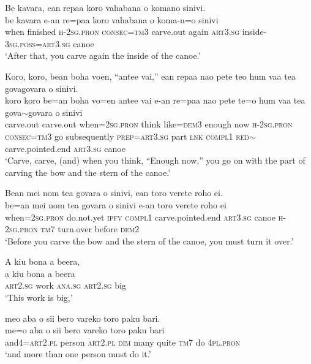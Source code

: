 \ea\label{ex:text18-18}
Be kavara, ean repaa koro vahabana o komano sinivi.\\
\gll be	kavara	e-an	re=paa	koro	vahabana	o	koma-n=o	sinivi\\
     when	finished	\textsc{h}-2\textsc{sg}.\textsc{pron}	\textsc{consec}=\textsc{tm}3	carve.out	again	\textsc{art}3.\textsc{sg}	inside-3\textsc{sg}.\textsc{poss}=\textsc{art}3.\textsc{sg}	canoe\\
\glt `After that, you carve again the inside of the canoe.'
\z

\ea\label{ex:text18-19}
Koro, koro, bean boha voen, ``antee vai,'' ean repaa nao pete teo hum vaa tea govagovara o sinivi.\\
\gll koro	koro	be=an	boha	vo=en	antee	vai	e-an	re=paa	nao	pete	te=o	hum	vaa	tea	gova{$\sim$}govara	o	sinivi\\
     carve.out	carve.out	when=2\textsc{sg}.\textsc{pron}	think	like=\textsc{dem}3	enough	now	\textsc{h}-2\textsc{sg}.\textsc{pron}	\textsc{consec}=\textsc{tm}3	go	subsequently	\textsc{prep}=\textsc{art}3.\textsc{sg}	part	\textsc{lnk}	\textsc{compl}1	\textsc{red}{$\sim$}carve.pointed.end	\textsc{art}3.\textsc{sg}	canoe\\
\glt `Carve, carve, (and) when you think, ``Enough now,'' you go on with the part of carving the bow and the stern of the canoe.'
\z

\ea\label{ex:text18-20}
Bean mei nom tea govara o sinivi, ean toro verete roho ei.\\
\gll be=an	mei	nom	tea	govara	o	sinivi	e-an	toro	verete	roho	ei\\
     when=2\textsc{sg}.\textsc{pron}	do.not.yet	\textsc{ipfv}	\textsc{compl}1	carve.pointed.end	\textsc{art}3.\textsc{sg}	canoe	\textsc{h}-2\textsc{sg}.\textsc{pron}	\textsc{tm}7	turn.over	before	\textsc{dem}2\\
\glt `Before you carve the bow and the stern of the canoe, you must turn it over.'
\z

\ea\label{ex:text18-21}
A kiu bona a beera,\\
\gll a	kiu	bona	a	beera\\
     \textsc{art}2.\textsc{sg}	work	\textsc{ana}.\textsc{sg}	\textsc{art}2.\textsc{sg}	big\\
\glt `This work is big,'
\z

\ea\label{ex:text18-22}
meo aba o sii bero vareko toro paku bari.\\
\gll me=o	aba	o	sii	bero	vareko	toro	paku	bari\\
     and4=\textsc{art}2.\textsc{pl}	person	\textsc{art}2.\textsc{pl}	\textsc{dim}	many	quite	\textsc{tm}7	do	4\textsc{pl}.\textsc{pron}\\
\glt `and more than one person must do it.'
\z

